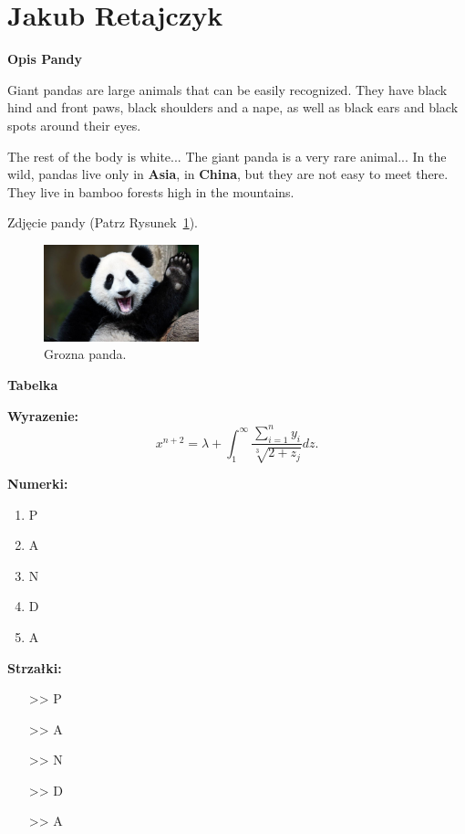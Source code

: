 \section{Jakub Retajczyk}
\label{sec:jretaj}


\bigskip
\textbf{Opis Pandy}
\bigskip

Giant pandas are large animals that can be easily recognized. They have black hind and front paws, black shoulders and a nape, as well as black ears and black spots around their eyes. 

The rest of the body is white...
The giant panda is a very rare animal... In the wild, pandas live only in \textbf{Asia}, in \textbf{China}, but they are not easy to meet there. They live in bamboo forests high in the mountains.

\bigskip
Zdjęcie pandy (Patrz Rysunek~\ref{fig:ppanda}).

\begin{figure}[htbp] 
    \centering
    \includegraphics[width=0.4\textwidth]{pictures/ppanda.jpg} 
    \caption{Grozna panda.}
    \label{fig:ppanda}
\end{figure}

\bigskip

\textbf{Tabelka}




\bigskip
\textbf{Wyrazenie:} 
\begin{equation}
    x^{n + 2} = \lambda + \int_{1}^{\infty} \frac{\sum_{i=1}^{n} y_{i}}{\sqrt[3]{2 + z_{j}}} dz.
\end{equation}
\bigskip

\newpage
\textbf{Numerki:}

\begin{enumerate}
    \item P
    \item A
    \item N
    \item D
    \item A
\end{enumerate}

\bigskip


\textbf{Strzałki:}

\begin{itemize}
    \item[>>] P
    \item[>>] A
    \item[>>] N
    \item[>>] D
    \item[>>] A
\end{itemize}